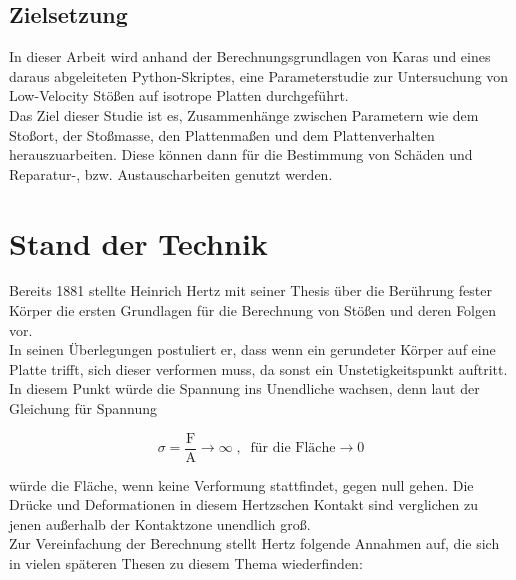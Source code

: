 \section{Zielsetzung}
In dieser Arbeit wird anhand der Berechnungsgrundlagen von Karas und eines
daraus abgeleiteten Python-Skriptes, eine Parameterstudie zur Untersuchung von
Low-Velocity Stößen auf isotrope Platten durchgeführt. \\
Das Ziel dieser Studie ist es, Zusammenhänge zwischen Parametern wie dem Stoßort,
der Stoßmasse, den Plattenmaßen und dem Plattenverhalten herauszuarbeiten. Diese
können dann für die Bestimmung von Schäden und Reparatur-, bzw.
Austauscharbeiten genutzt werden.\\

\chapter{Stand der Technik}

Bereits 1881 stellte Heinrich Hertz mit seiner Thesis über die Berührung fester
Körper die ersten Grundlagen für die Berechnung von Stößen und deren Folgen vor.
\cite{Hertz.1881} \\
In seinen Überlegungen postuliert er, dass wenn ein gerundeter Körper auf eine
Platte trifft, sich dieser verformen muss, da sonst ein Unstetigkeitspunkt
auftritt. In diesem Punkt würde die Spannung ins Unendliche wachsen, denn laut
der Gleichung für Spannung 

\begin{equation}
\label{form:Druck}
\sigma = \frac{\mbox{F}}{\mbox{A}} \rightarrow \infty \; , \; \; \mbox{für die Fläche} \rightarrow 0
\end{equation}

würde die Fläche, wenn keine Verformung stattfindet, gegen null gehen. Die Drücke
und Deformationen in diesem Hertzschen Kontakt sind verglichen zu jenen
außerhalb der Kontaktzone unendlich groß. \\
Zur Vereinfachung der Berechnung stellt Hertz folgende Annahmen auf, die sich in
vielen späteren Thesen zu diesem Thema wiederfinden:

